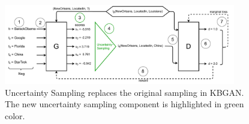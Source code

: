 \begin{figure}[H]
  \centering
    \includegraphics[width=0.90\textwidth]{figures/ucgan_architecture.pdf}
  \caption{Uncertainty Sampling replaces the original sampling in \ac{KBGAN}. 
  The new uncertainty sampling component is highlighted in green color.}
  \label{fig:uncertainty_sampling_architecture}
\end{figure}